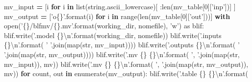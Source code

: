 \documentclass[]{book}
\newenvironment{Shaded}{\begin{snugshade}}{\end{snugshade}}
\newcommand{\BuiltInTok}[1]{#1}
\newcommand{\CharTok}[1]{\textcolor[rgb]{0.31,0.60,0.02}{#1}}
\newcommand{\ControlFlowTok}[1]{\textcolor[rgb]{0.13,0.29,0.53}{\textbf{#1}}}
\newcommand{\DecValTok}[1]{\textcolor[rgb]{0.00,0.00,0.81}{#1}}
\newcommand{\ImportTok}[1]{#1}
\newcommand{\KeywordTok}[1]{\textcolor[rgb]{0.13,0.29,0.53}{\textbf{#1}}}
\newcommand{\NormalTok}[1]{#1}
\newcommand{\OperatorTok}[1]{\textcolor[rgb]{0.81,0.36,0.00}{\textbf{#1}}}
\newcommand{\SpecialCharTok}[1]{\textcolor[rgb]{0.00,0.00,0.00}{#1}}
\newcommand{\StringTok}[1]{\textcolor[rgb]{0.31,0.60,0.02}{#1}}
\begin{document}
\begin{Shaded}
\begin{Highlighting}[]
\NormalTok{mv_input }\OperatorTok{=}\NormalTok{ [i }\ControlFlowTok{for}\NormalTok{ i }\KeywordTok{in} \BuiltInTok{list}\NormalTok{(string.ascii_lowercase)[}
\NormalTok{    :}\BuiltInTok{len}\NormalTok{(mv_table[}\DecValTok{0}\NormalTok{][}\StringTok{'inp'}\NormalTok{])]}
\NormalTok{  ]}
\NormalTok{mv_output }\OperatorTok{=}\NormalTok{ [}\StringTok{'o}\SpecialCharTok{\{\}}\StringTok{'}\NormalTok{.}\BuiltInTok{format}\NormalTok{(i) }\ControlFlowTok{for}\NormalTok{ i }\KeywordTok{in} \BuiltInTok{range}\NormalTok{(}\BuiltInTok{len}\NormalTok{(mv_table[}\DecValTok{0}\NormalTok{][}\StringTok{'out'}\NormalTok{]))]}
\ControlFlowTok{with} \BuiltInTok{open}\NormalTok{(}\StringTok{'}\SpecialCharTok{\{\}}\StringTok{/blfmv/}\SpecialCharTok{\{\}}\StringTok{.mv'}\NormalTok{.}\BuiltInTok{format}\NormalTok{(working_dir, nomefile), }\StringTok{'w'}\NormalTok{) }\ImportTok{as}\NormalTok{ blif:}
\NormalTok{  blif.write(}\StringTok{'.model }\SpecialCharTok{\{\}}\CharTok{\textbackslash{}n}\StringTok{'}\NormalTok{.}\BuiltInTok{format}\NormalTok{(working_dir, nomefile))}
\NormalTok{  blif.write(}\StringTok{'.inputs }\SpecialCharTok{\{\}}\CharTok{\textbackslash{}n}\StringTok{'}\NormalTok{.}\BuiltInTok{format}\NormalTok{(}
      \StringTok{' '}\NormalTok{.join(}\BuiltInTok{map}\NormalTok{(}\BuiltInTok{str}\NormalTok{, mv_input))))}
\NormalTok{  blif.write(}\StringTok{'.outputs }\SpecialCharTok{\{\}}\CharTok{\textbackslash{}n}\StringTok{'}\NormalTok{.}\BuiltInTok{format}\NormalTok{(}
      \StringTok{' '}\NormalTok{.join(}\BuiltInTok{map}\NormalTok{(}\BuiltInTok{str}\NormalTok{, mv_output))))}
\NormalTok{  blif.write(}\StringTok{'.mv }\SpecialCharTok{\{\}}\StringTok{ }\SpecialCharTok{\{\}}\CharTok{\textbackslash{}n}\StringTok{'}\NormalTok{.}\BuiltInTok{format}\NormalTok{(}
      \StringTok{', '}\NormalTok{.join(}\BuiltInTok{map}\NormalTok{(}\BuiltInTok{str}\NormalTok{, mv_input)), mv))}
\NormalTok{  blif.write(}\StringTok{'.mv }\SpecialCharTok{\{\}}\StringTok{ }\SpecialCharTok{\{\}}\CharTok{\textbackslash{}n}\StringTok{'}\NormalTok{.}\BuiltInTok{format}\NormalTok{(}
      \StringTok{', '}\NormalTok{.join(}\BuiltInTok{map}\NormalTok{(}\BuiltInTok{str}\NormalTok{, mv_output)), mv))}
  \ControlFlowTok{for}\NormalTok{ count, out }\KeywordTok{in} \BuiltInTok{enumerate}\NormalTok{(mv_output):}
\NormalTok{      blif.write(}\StringTok{'.table }\SpecialCharTok{\{\}}\StringTok{ }\SpecialCharTok{\{\}}\CharTok{\textbackslash{}n}\StringTok{'}\NormalTok{.}\BuiltInTok{format}\NormalTok{(}

\end{Highlighting}
\end{Shaded}
\end{document}
